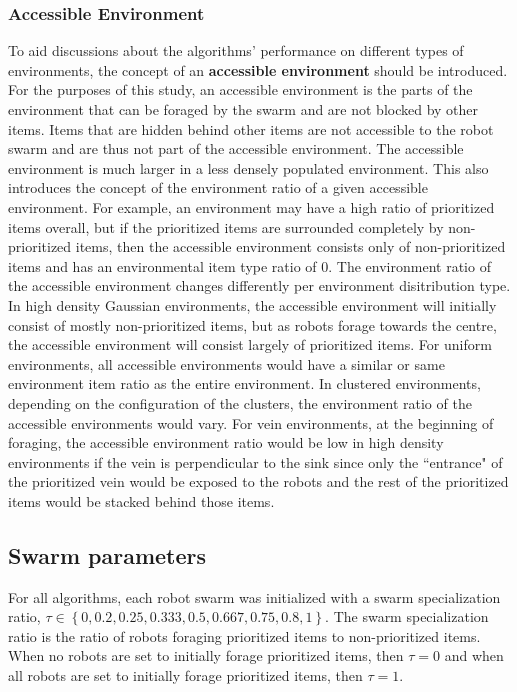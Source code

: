 \documentclass[preprint,12pt]{elsarticle}
\begin{document}
\subsubsection{Accessible Environment}
\label{accessibleenvironment}

To aid discussions about the algorithms' performance on different types of environments, the concept of an \textbf{accessible environment} should be introduced. For the purposes of this study, an accessible environment is the parts of the environment that can be foraged by the swarm and are not blocked by other items. Items that are hidden behind other items are not accessible to the robot swarm and are thus not part of the accessible environment. The accessible environment is much larger in a less densely populated environment. This also introduces the concept of the environment ratio of a given accessible environment. For example, an environment may have a high ratio of prioritized items overall, but if the prioritized items are surrounded completely by non-prioritized items, then the accessible environment consists only of non-prioritized items and has an environmental item type ratio of 0. The environment ratio of the accessible environment changes differently per environment disitribution type. In high density Gaussian environments, the accessible environment will initially consist of mostly non-prioritized items, but as robots forage towards the centre, the accessible environment will consist largely of prioritized items. For uniform environments, all accessible environments would have a similar or same environment item ratio as the entire environment. In clustered environments, depending on the configuration of the clusters, the environment ratio of the accessible environments would vary. For vein environments, at the beginning of foraging, the accessible environment ratio would be low in high density environments if the vein is perpendicular to the sink since only the ``entrance" of the prioritized vein would be exposed to the robots and the rest of the prioritized items would be stacked behind those items. 

\subsection{Swarm parameters}
\label{swarmparameters}

For all algorithms, each robot swarm was initialized with a swarm specialization ratio, $\tau\in\left\{0, 0.2, 0.25, 0.333, 0.5, 0.667, 0.75, 0.8,1\right\}$. The swarm specialization ratio is the ratio of robots foraging prioritized items to non-prioritized items. When no robots are set to initially forage prioritized items, then $\tau=0$ and when all robots are set to initially forage prioritized items, then $\tau=1$.
\end{document}
